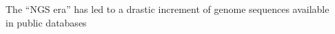 \documentclass[10pt]{beamer}
\begin{document}
\begin{frame}
\begin{overlayarea}{\textwidth}{\textheight}
{{\begin{columns}
\begin{column}{0.6\textwidth}
\begin{center}
			\end{center}
		\end{column}
		\begin{column}{0.4\textwidth}
			\normalsize{%
			The ``NGS era'' has led to a drastic increment of genome sequences available in public databases
			}	
		\end{column}		
	\end{columns}
	}
	}
	\end{overlayarea}
\end{frame}
\end{document}
